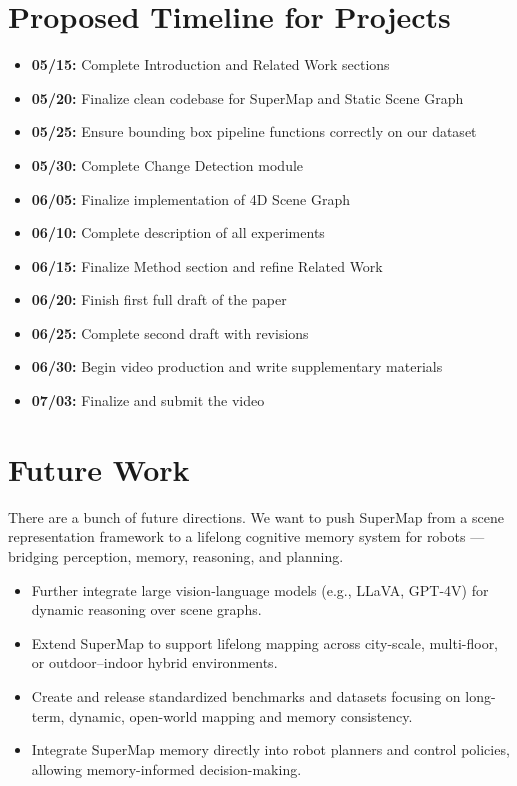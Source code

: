 \section{Proposed Timeline for Projects}

\begin{itemize}
    \item \textbf{05/15:} Complete Introduction and Related Work sections  
    \item \textbf{05/20:} Finalize clean codebase for SuperMap and Static Scene Graph  
    \item \textbf{05/25:} Ensure bounding box pipeline functions correctly on our dataset  
    \item \textbf{05/30:} Complete Change Detection module  
    \item \textbf{06/05:} Finalize implementation of 4D Scene Graph  
    \item \textbf{06/10:} Complete description of all experiments  
    \item \textbf{06/15:} Finalize Method section and refine Related Work  
    \item \textbf{06/20:} Finish first full draft of the paper  
    \item \textbf{06/25:} Complete second draft with revisions  
    \item \textbf{06/30:} Begin video production and write supplementary materials  
    \item \textbf{07/03:} Finalize and submit the video  
\end{itemize}

\section{Future Work}
There are a bunch of future directions. We want to push SuperMap from a scene representation framework to a lifelong cognitive memory system for robots — bridging perception, memory, reasoning, and planning.
\begin{itemize}
    \item Further integrate large vision-language models (e.g., LLaVA, GPT-4V) for dynamic reasoning over scene graphs.
    \item Extend SuperMap to support lifelong mapping across city-scale, multi-floor, or outdoor–indoor hybrid environments.
    \item Create and release standardized benchmarks and datasets focusing on long-term, dynamic, open-world mapping and memory consistency.
    \item Integrate SuperMap memory directly into robot planners and control policies, allowing memory-informed decision-making.
\end{itemize}
